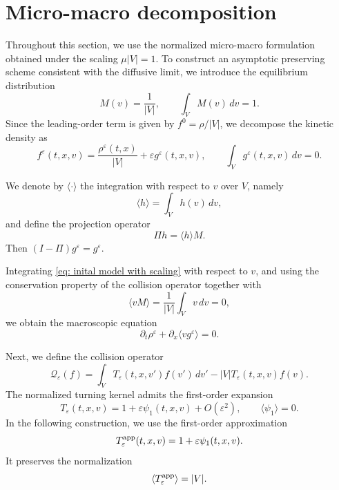 \documentclass[11pt,twoside]{article}
\theoremstyle{plain}
\theoremstyle{nonumberplain}
\begin{document}
{\color{red}
\section{Micro-macro decomposition}
\label{sec: micro macro decomp}

Throughout this section, we use the normalized micro-macro formulation
obtained under the scaling $\mu |V|=1$. 
To construct an asymptotic preserving scheme consistent with the diffusive limit, we introduce the equilibrium distribution
\[
M(v)=\frac1{|V|},
\qquad \int_V M(v)\,dv=1.
\]
Since the leading-order term is given by \(f^0=\rho/|V|\), we decompose the kinetic density as
\begin{equation}\label{f_expansion}
f^\varepsilon(t,x,v)=\frac{\rho^\varepsilon(t,x)}{|V|}+\varepsilon g^\varepsilon(t,x,v),
\qquad
\int_V g^\varepsilon(t,x,v)\,dv=0.
\end{equation}


We denote by \(\langle \cdot \rangle\) the integration with respect to \(v\) over \(V\), namely
\[
\langle h\rangle = \int_V h(v)\,dv,
\]
and define the projection operator
\[
\Pi h = \langle h\rangle M.
\]
Then \((I-\Pi)g^\varepsilon=g^\varepsilon\).

Integrating \eqref{eq: inital model with scaling} with respect to \(v\), and using the conservation property of the collision operator together with
\[
\langle vM\rangle = \frac1{|V|}\int_V v\,dv = 0,
\]
we obtain the macroscopic equation
\[
\partial_t \rho^\varepsilon + \partial_x \langle v g^\varepsilon\rangle = 0.
\]

Next, we define the collision operator
\[
\mathcal{Q}_\varepsilon(f)
=
\int_V T_\varepsilon(t,x,v')f(v')\,dv'
-
|V|T_\varepsilon(t,x,v)f(v).
\]
The normalized turning kernel admits the first-order expansion
\[
T_\varepsilon(t,x,v)
=
1+\varepsilon\psi_1(t,x,v)+O(\varepsilon^2),
\qquad
\langle \psi_1\rangle=0.
\]
In the following construction, we use the first-order approximation
\[
T_\varepsilon^{\rm app}(t,x,v)
=
1+\varepsilon\psi_1(t,x,v).
\]
It preserves the normalization
\[
\langle T_\varepsilon^{\rm app}\rangle=|V|.
\]

}
\end{document}
